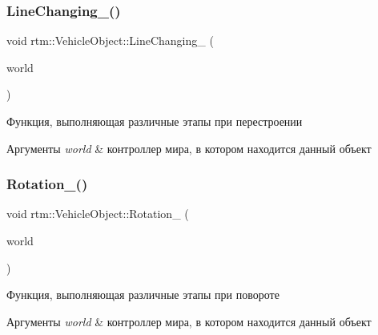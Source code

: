 \subsubsection{\texorpdfstring{Line\+Changing\+\_\+()}{LineChanging\_()}}
{\footnotesize\ttfamily void rtm\+::\+Vehicle\+Object\+::\+Line\+Changing\+\_\+ (\begin{DoxyParamCaption}\item[{\hyperlink{classrtm_1_1_world_controller}{World\+Controller} $\ast$const}]{world }\end{DoxyParamCaption})\hspace{0.3cm}{\ttfamily [private]}}

Функция, выполняющая различные этапы при перестроении 
\begin{DoxyParams}{Аргументы}
{\em world} & контроллер мира, в котором находится данный объект \\
\hline
\end{DoxyParams}
\mbox{\label{classrtm_1_1_vehicle_object_a6961d03a7e8a805a9bd4422a8d0c1985}} 
\subsubsection{\texorpdfstring{Rotation\+\_\+()}{Rotation\_()}}
{\footnotesize\ttfamily void rtm\+::\+Vehicle\+Object\+::\+Rotation\+\_\+ (\begin{DoxyParamCaption}\item[{\hyperlink{classrtm_1_1_world_controller}{World\+Controller} $\ast$const}]{world }\end{DoxyParamCaption})\hspace{0.3cm}{\ttfamily [private]}}

Функция, выполняющая различные этапы при повороте 
\begin{DoxyParams}{Аргументы}
{\em world} & контроллер мира, в котором находится данный объект \\
\hline
\end{DoxyParams}
\mbox{\label{classrtm_1_1_vehicle_object_a0db960e75dbcb12d028b239e441ea0ed}} 
